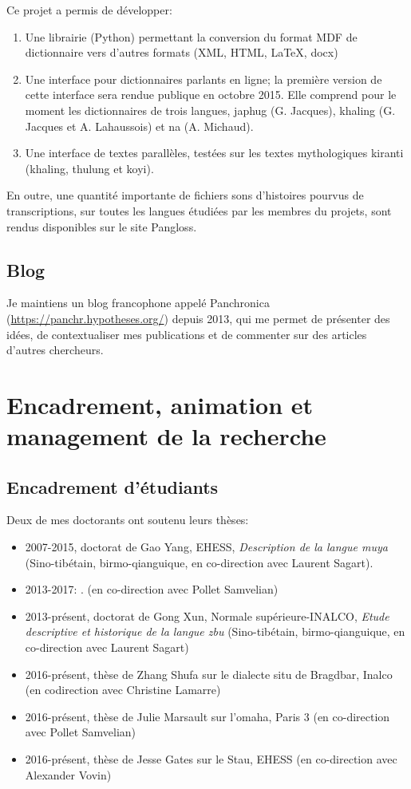 \documentclass[oldfontcommands,oneside,a4paper,11pt]{article}
\begin{document}
Ce projet a permis de développer:

\begin{enumerate}
\item Une librairie (Python) permettant la conversion du format MDF de dictionnaire vers d'autres formats (XML, HTML, \LaTeX, docx)
\item Une interface pour dictionnaires parlants en ligne; la première version de cette interface sera rendue publique en octobre 2015. Elle comprend pour le moment les dictionnaires de trois langues, japhug (G. Jacques), khaling (G. Jacques et A. Lahaussois) et na (A. Michaud).
\item Une interface de textes parallèles, testées sur les textes mythologiques kiranti (khaling, thulung et koyi).
\end{enumerate}

En outre, une quantité importante de fichiers sons d'histoires pourvus de transcriptions, sur toutes les langues étudiées par les membres du projets, sont rendus disponibles sur le site Pangloss.

\subsection{Blog}
Je maintiens un blog francophone appelé Panchronica (\url{https://panchr.hypotheses.org/}) depuis 2013, qui me permet de présenter des idées, de contextualiser mes publications et de commenter sur des articles d'autres chercheurs.


\section{Encadrement, animation et management de la recherche}
\subsection{Encadrement d'étudiants}
Deux de mes doctorants ont soutenu leurs thèses:
\begin{itemize}
\item 2007-2015, doctorat de Gao Yang, EHESS, \textit{Description de la langue muya} (Sino-tibétain, birmo-qianguique, en co-direction avec Laurent Sagart).
\item 2013-2017: . (en co-direction avec Pollet Samvelian)
\end{itemize}

\begin{itemize}
\item 2013-présent, doctorat de Gong Xun, Normale supérieure-INALCO, \textit{Etude descriptive et historique de la langue zbu} (Sino-tibétain, birmo-qianguique, en co-direction avec Laurent Sagart)
\item 2016-présent, thèse de Zhang Shufa sur le dialecte situ de Bragdbar, Inalco (en codirection avec Christine Lamarre)
\item 2016-présent, thèse de Julie Marsault sur l'omaha, Paris 3 (en co-direction avec Pollet Samvelian)
\item 2016-présent, thèse de Jesse Gates sur le Stau, EHESS (en co-direction avec Alexander Vovin)
\end{itemize}
\end{document}
